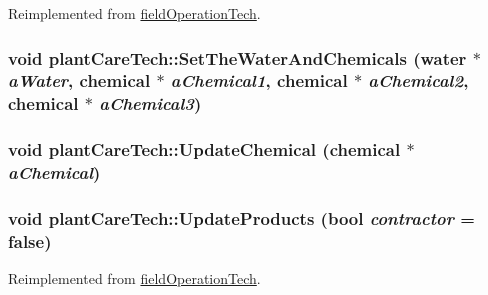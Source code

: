 Reimplemented from \hyperlink{classfield_operation_tech_a2a2c416f3f3fe8ceb2f1f1b63c149a09}{fieldOperationTech}.\hypertarget{classplant_care_tech_a55d4a7b94fdbb6f1d3533b2f5b4b20dc}{
\subsubsection[{SetTheWaterAndChemicals}]{\setlength{\rightskip}{0pt plus 5cm}void plantCareTech::SetTheWaterAndChemicals ({\bf water} $\ast$ {\em aWater}, \/  {\bf chemical} $\ast$ {\em aChemical1}, \/  {\bf chemical} $\ast$ {\em aChemical2}, \/  {\bf chemical} $\ast$ {\em aChemical3})}}
\label{classplant_care_tech_a55d4a7b94fdbb6f1d3533b2f5b4b20dc}
\hypertarget{classplant_care_tech_a99f5c674a3ae4cb85e1a56e2b3bb46cf}{
\subsubsection[{UpdateChemical}]{\setlength{\rightskip}{0pt plus 5cm}void plantCareTech::UpdateChemical ({\bf chemical} $\ast$ {\em aChemical})}}
\label{classplant_care_tech_a99f5c674a3ae4cb85e1a56e2b3bb46cf}
\hypertarget{classplant_care_tech_a877ed4e1f3d84637783c1ac0474a6bc6}{
\subsubsection[{UpdateProducts}]{\setlength{\rightskip}{0pt plus 5cm}void plantCareTech::UpdateProducts (bool {\em contractor} = {\ttfamily false})}}
\label{classplant_care_tech_a877ed4e1f3d84637783c1ac0474a6bc6}


Reimplemented from \hyperlink{classfield_operation_tech_ab0b2bf71efca78b637837fc4d0e3a9d4}{fieldOperationTech}.

